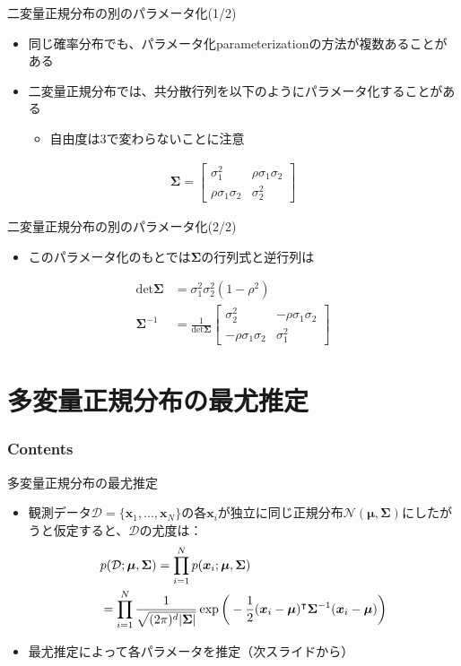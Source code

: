 \documentclass[aspectratio=169,unicode,dvipdfmx,14pt]{beamer}
\begin{document}
\begin{frame}{二変量正規分布の別のパラメータ化(1/2)}
\begin{itemize}
\item 同じ確率分布でも、パラメータ化parameterizationの方法が複数あることがある
\item 二変量正規分布では、共分散行列を以下のようにパラメータ化することがある
\begin{itemize}
\item 自由度は3で変わらないことに注意
\end{itemize}
\end{itemize}
\begin{align}
\bm{\Sigma} = \begin{bmatrix} \sigma_1^2 & \rho\sigma_1\sigma_2 \\
\rho\sigma_1\sigma_2 & \sigma_2^2 \end{bmatrix}
\end{align}
\end{frame}

\begin{frame}{二変量正規分布の別のパラメータ化(2/2)}
\begin{itemize}
\item このパラメータ化のもとでは$\bm{\Sigma}$の行列式と逆行列は
\end{itemize}
\begin{align}
\mbox{det}\bm{\Sigma} &= \sigma_1^2\sigma_2^2(1-\rho^2) \\
\bm{\Sigma}^{-1} &= \frac{1}{\mbox{det}\bm{\Sigma}}
\begin{bmatrix} \sigma_2^2 & -\rho\sigma_1\sigma_2 \\ -\rho\sigma_1\sigma_2 & \sigma_1^2 \end{bmatrix}
\end{align}
\end{frame}

\section{多変量正規分布の最尤推定}

\begin{frame}\frametitle{Contents}
\Large \tableofcontents[currentsection]
\end{frame}

\begin{frame}{多変量正規分布の最尤推定}
\begin{itemize}
\item 観測データ$\mathcal{D}=\{ \bm{x}_1,\ldots,\bm{x}_N\}$の各$\bm{x}_i$が独立に同じ正規分布$\mathcal{N}(\bm{\mu},\bm{\Sigma})$にしたがうと仮定すると、$\mathcal{D}$の尤度は：
\begin{align}
& p(\mathcal{D};\bm{\mu},\bm{\Sigma})
= \prod_{i=1}^N p(\bm{x}_i;\bm{\mu},\bm{\Sigma})
\notag \\ & =
\prod_{i=1}^N \frac{1}{\sqrt{(2\pi)^d|\bm{\Sigma}|}}
\exp\bigg( - \frac{1}{2} (\bm{x}_i - \bm{\mu})^\intercal \bm{\Sigma}^{-1} (\bm{x}_i - \bm{\mu}) \bigg)
\end{align}
\item 最尤推定によって各パラメータを推定（次スライドから）
\end{itemize}
\end{frame}
\end{document}
